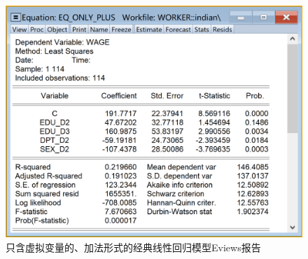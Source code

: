 \documentclass[12pt,(landscape,a4paper),(portrait,a4paper)]{article}
\theoremstyle{definition}
\theoremstyle{definition}
\theoremstyle{definition}
\theoremstyle{remark}
\begin{document}
\begin{figure}

{\centering \includegraphics[width=19.4in]{picture/lab8-dummy-model/2-only-plus-report} 

}

\caption{只含虚拟变量的、加法形式的经典线性回归模型Eviews报告}\label{fig:only-plus-report}
\end{figure}
\end{document}
